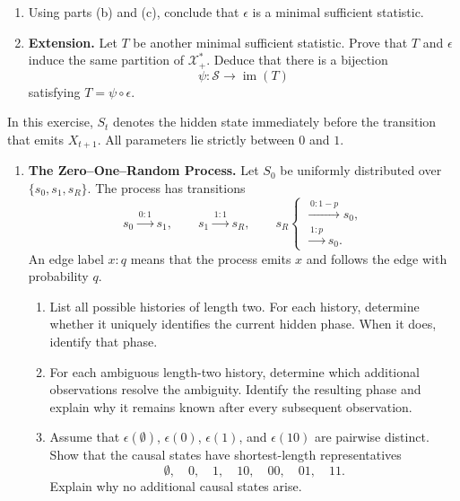 \documentclass[11pt]{article}
\begin{document}
\begin{exercise}
\begin{enumerate}
    \item Using parts (b) and (c), conclude that $\epsilon$ is a minimal
      sufficient statistic.

    \item \textbf{Extension.} Let $T$ be another minimal sufficient
      statistic. Prove that $T$ and $\epsilon$ induce the same partition of
      $\mathcal X_+^*$. Deduce that there is a bijection
      \[
        \psi:\mathcal S\to\operatorname{im}(T)
      \]
      satisfying $T=\psi\circ\epsilon$.
  \end{enumerate}
\end{exercise}

\begin{exercise}
\label{ex:p2-3}
  In this exercise, $S_t$ denotes the hidden state immediately before the
  transition that emits $X_{t+1}$. All parameters lie strictly between $0$
  and $1$.

  \begin{enumerate}
    \item \textbf{The Zero--One--Random Process.}
      Let $S_0$ be uniformly distributed over
      $\{s_0,s_1,s_R\}$. The process has transitions
      \[
        s_0\xrightarrow{\,0:1\,}s_1,
        \qquad
        s_1\xrightarrow{\,1:1\,}s_R,
        \qquad
        s_R
        \begin{cases}
          \xrightarrow{\,0:1-p\,}s_0,\\[-1mm]
          \xrightarrow{\,1:p\,}s_0.
        \end{cases}
      \]
      An edge label $x:q$ means that the process emits $x$ and follows the
      edge with probability $q$.

      \begin{enumerate}
        \item List all possible histories of length two. For each history,
          determine whether it uniquely identifies the current hidden phase.
          When it does, identify that phase.

        \item For each ambiguous length-two history, determine which
          additional observations resolve the ambiguity. Identify the
          resulting phase and explain why it remains known after every
          subsequent observation.

        \item Assume that $\epsilon(\emptyset)$, $\epsilon(0)$,
          $\epsilon(1)$, and $\epsilon(10)$ are pairwise distinct. Show that
          the causal states have shortest-length representatives
          \[
            \emptyset,\quad 0,\quad 1,\quad 10,\quad 00,\quad 01,\quad 11.
          \]
          Explain why no additional causal states arise.


\end{enumerate}
\end{enumerate}
\end{exercise}
\end{document}
